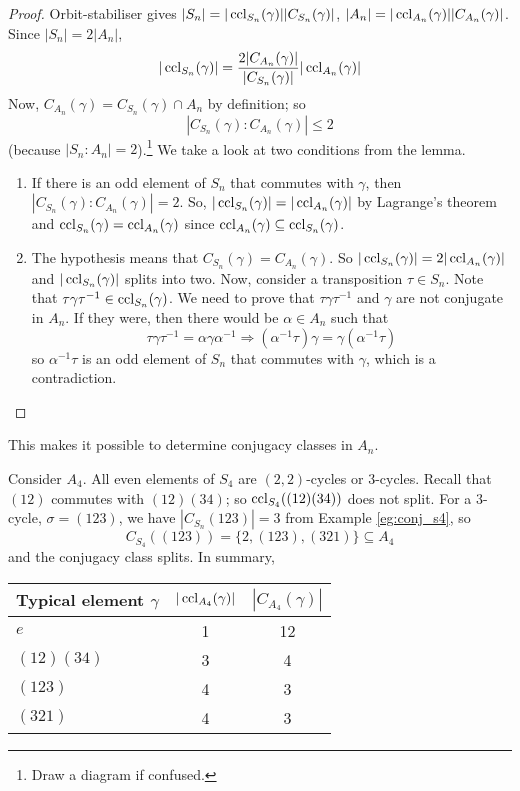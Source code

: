 \documentclass[10pt, a4paper, twoside]{report}
\begin{document}
\begin{proof}
    Orbit-stabiliser gives \(|S_n|=|\operatorname{ccl}_{S_n}(\gamma)||C_{S_n}(\gamma)|\), \(|A_n|=|\operatorname{ccl}_{A_n}(\gamma)||C_{A_n}(\gamma)|\). \\ Since \(|S_n|=2|A_n|\), 
    \[|\operatorname{ccl}_{S_n}(\gamma)|=\frac{2|C_{A_n}(\gamma)|}{|C_{S_n}(\gamma)|}|\operatorname{ccl}_{A_n}(\gamma)|\]
    Now, \(C_{A_n}(\gamma)=C_{S_n}(\gamma)\cap A_n\) by definition; so 
    \[|C_{S_n}(\gamma):C_{A_n}(\gamma)|\leq 2\]
    (because \(|S_n:A_n|=2\)).\footnote{Draw a diagram if confused.}
    We take a look at two conditions from the lemma.
    \begin{enumerate}
        \item If there is an odd element of \(S_n\) that commutes with \(\gamma\), then \(|C_{S_n}(\gamma):C_{A_n}(\gamma)|=2\). So, \(|\operatorname{ccl}_{S_n}(\gamma)|=|\operatorname{ccl}_{A_n}(\gamma)|\) by Lagrange's theorem and \(\operatorname{ccl}_{S_n}(\gamma)=\operatorname{ccl}_{A_n}(\gamma)\) since \(\operatorname{ccl}_{A_n}(\gamma)\subseteq\operatorname{ccl}_{S_n}(\gamma)\).
        \item The hypothesis means that \(C_{S_n}(\gamma)=C_{A_n}(\gamma)\). So \(|\operatorname{ccl}_{S_n}(\gamma)|=2|\operatorname{ccl}_{A_n}(\gamma)|\) and \(|\operatorname{ccl}_{S_n}(\gamma)|\) splits into two. Now, consider a transposition \(\tau\in S_n\). Note that \(\tau\gamma\tau^{-1}\in\operatorname{ccl}_{S_n}(\gamma)\). We need to prove that \(\tau\gamma\tau^{-1}\) and \(\gamma\) are not conjugate in \(A_n\). If they were, then there would be \(\alpha\in A_n\) such that 
        \[\tau\gamma\tau^{-1}=\alpha\gamma\alpha^{-1}\Rightarrow(\alpha^{-1}\tau)\gamma=\gamma(\alpha^{-1}\tau)\]
        so \(\alpha^{-1}\tau\) is an odd element of \(S_n\) that commutes with \(\gamma\), which is a contradiction.
    \end{enumerate}
\end{proof}
This makes it possible to determine conjugacy classes in \(A_n\).
\begin{example}
    Consider \(A_4\). All even elements of \(S_4\) are \((2,2)\)-cycles or \(3\)-cycles. Recall that \((12)\) commutes with \((12)(34)\); so \(\operatorname{ccl}_{S_4}((12)(34))\) does not split. For a \(3\)-cycle, \(\sigma=(123)\), we have \(|C_{S_n}(123)|=3\) from Example \ref{eg:conj_s4}, so 
    \[C_{S_4}\left((123)\right)=\{2,(123),(321)\}\subseteq A_4\]
    and the conjugacy class splits. In summary,
    \begin{table}[H]
        \centering
        \begin{tabularx}{0.6\textwidth}{Xcc}
            \toprule
            Typical element \(\gamma\) & \(|\operatorname{ccl}_{A_4}(\gamma)|\) & \(|C_{A_4}(\gamma)|\) \\
            \midrule
            \(e\) & 1 & 12 \\
            \((12)(34)\) & 3 & 4 \\
            \((123)\) & 4 & 3 \\
            \((321)\) & 4 & 3 \\
            \bottomrule 
        \end{tabularx}
    \end{table}
\end{example}
\end{document}
